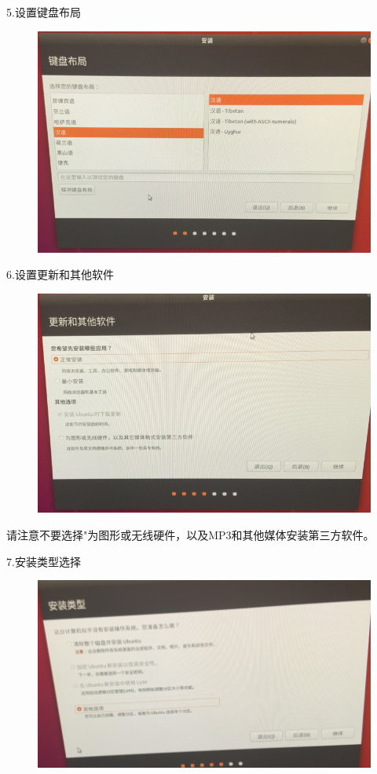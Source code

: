 \documentclass[openbib]{article}
\begin{document}
5.设置键盘布局
\begin{figure}[H]
	\centering
	\includegraphics[scale=0.3]{31}
\end{figure}

6.设置更新和其他软件
\begin{figure}[H]
	\centering
	\includegraphics[scale=0.3]{32}
\end{figure}
请注意不要选择"为图形或无线硬件，以及MP3和其他媒体安装第三方软件。

7.安装类型选择
\begin{figure}[H]
	\centering
	\includegraphics[scale=0.3]{33}
\end{figure}
\end{document}
